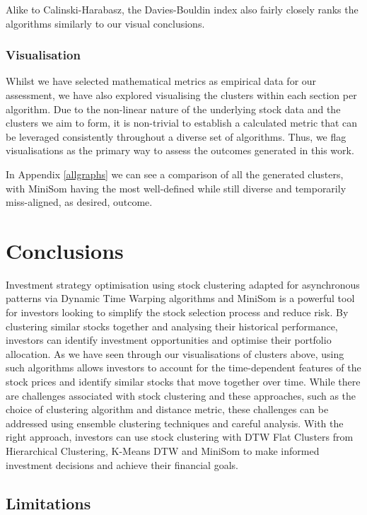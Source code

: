 \documentclass[11pt]{article}
\begin{document}
Alike to Calinski-Harabasz, the Davies-Bouldin index also fairly closely ranks the algorithms similarly to our visual conclusions.

\subsubsection{Visualisation}

Whilst we have selected mathematical metrics as empirical data for our assessment, we have also explored visualising the clusters within each section per algorithm. Due to the non-linear nature of the underlying stock data and the clusters we aim to form, it is non-trivial to establish a calculated metric that can be leveraged consistently throughout a diverse set of algorithms. Thus, we flag visualisations as the primary way to assess the outcomes generated in this work.

In Appendix \ref{allgraphs} we can see a comparison of all the generated clusters, with MiniSom having the most well-defined while still diverse and temporarily miss-aligned, as desired, outcome.

\section{Conclusions}
Investment strategy optimisation using stock clustering adapted for asynchronous patterns via Dynamic Time Warping algorithms and MiniSom is a powerful tool for investors looking to simplify the stock selection process and reduce risk. By clustering similar stocks together and analysing their historical performance, investors can identify investment opportunities and optimise their portfolio allocation. As we have seen through our visualisations of clusters above, using such algorithms allows investors to account for the time-dependent features of the stock prices and identify similar stocks that move together over time. While there are challenges associated with stock clustering and these approaches, such as the choice of clustering algorithm and distance metric, these challenges can be addressed using ensemble clustering techniques and careful analysis. With the right approach, investors can use stock clustering with DTW Flat Clusters from Hierarchical Clustering, K-Means DTW and MiniSom to make informed investment decisions and achieve their financial goals.


\subsection{Limitations}
\end{document}
